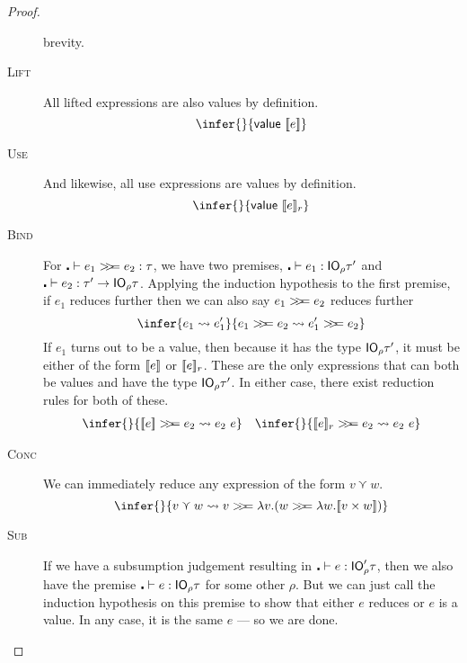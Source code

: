 \begin{proof}
\begin{description}
    brevity.
  \item[\rm\textsc{Lift}] All lifted expressions are also values by
    definition.
    \[\infer{ }{\textsf{value} \ \lift{e}}\]
  \item[\rm\textsc{Use}] And likewise, all use expressions are values
    by definition.
    \[\infer{ }{\textsf{value} \ \use{r}{e}}\]
  \item[\rm\textsc{Bind}] For $\centerdot \vdash e_1 \bind e_2 : \tau$, we have two
    premises, $\centerdot \vdash e_1 : \IO_\rho \tau'$ and
    $\centerdot \vdash e_2 : \tau' \rightarrow \IO_\rho \tau$. Applying the induction hypothesis to the
    first premise, if $e_1$ reduces further then we can also say
    $e_1 \bind e_2$ reduces further
    \[\infer{e_1 \leadsto e_1'}{e_1 \bind e_2 \leadsto e_1' \bind e_2} \]
    If $e_1$ turns out to be a value, then because it has the type
    $\IO_\rho \tau'$, it must be either of the form $\lift{e}$ or
    $\use{r}{e}$. These are the only expressions that can both be
    values and have the type $\IO_\rho \tau'$.
    In either case, there exist reduction rules for both of these.
    \begin{align*}
      \infer{ }{\lift{e} \bind e_2 \leadsto e_2 \ e}&&
      \infer{ }{\use{r}{e} \bind e_2 \leadsto e_2 \ e}
    \end{align*}
  \item[\rm\textsc{Conc}] We can immediately reduce any expression
    of the form $v \curlyvee w$.
    \[ \infer{ }{v \curlyvee w \leadsto v \bind \lambda v . (w \bind \lambda w . \lift{v \times
          w})} \]
  \item[\rm\textsc{Sub}] If we have a subsumption judgement resulting
      in $\centerdot \vdash e : \IO_\rho' \tau$, then we also have the premise $\centerdot \vdash e :
      \IO_\rho \tau$ for some other $\rho$. But we can just call the induction
      hypothesis on this premise to show that either $e$ reduces or
      $e$ is a value. In any case, it is the same $e$ --- so we are done.
  \end{description}
\end{proof}

